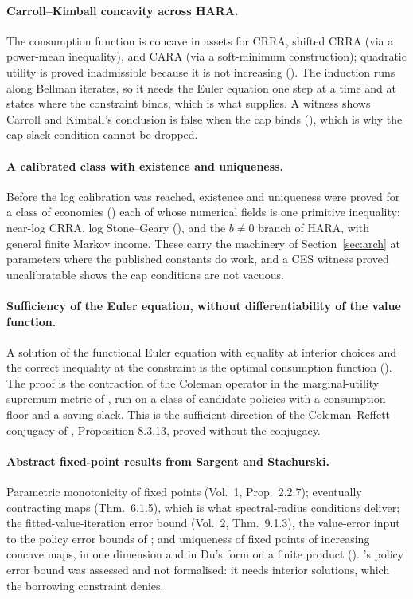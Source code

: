 \paragraph{Carroll--Kimball concavity across HARA.}
The consumption function is concave in assets for CRRA, shifted CRRA (via a power-mean
inequality), and CARA (via a soft-minimum construction); quadratic utility is proved inadmissible
because it is not increasing (). The induction runs along
Bellman iterates, so it needs the Euler equation one step at a time and at states where the
constraint binds, which is what  supplies. A witness shows Carroll and
Kimball's conclusion is false when the cap binds (),
which is why the cap slack condition cannot be dropped.

\paragraph{A calibrated class with existence and uniqueness.}
Before the log calibration was reached, existence and uniqueness were proved for a class of
economies () each of whose numerical fields is one primitive inequality: near-log
CRRA, log Stone--Geary (), and the $b\neq0$
branch of HARA, with general finite Markov income. These carry the machinery of
Section~\ref{sec:arch} at parameters where the published constants do work, and a CES witness
proved uncalibratable shows the cap conditions are not vacuous.

\paragraph{Sufficiency of the Euler equation, without differentiability of the value function.}
A solution of the functional Euler equation with equality at interior choices and the correct
inequality at the constraint is the optimal consumption function
(). The proof is the contraction of the Coleman
operator in the marginal-utility supremum metric of \citet{LiStachurski2014}, run on a class of
candidate policies with a consumption floor and a saving slack. This is the sufficient direction
of the Coleman--Reffett conjugacy of \citet{SargentStachurski2024}, Proposition 8.3.13, proved
without the conjugacy.

\paragraph{Abstract fixed-point results from Sargent and Stachurski.}
Parametric monotonicity of fixed points (Vol.\ 1, Prop.\ 2.2.7); eventually contracting maps
(Thm.\ 6.1.5), which is what spectral-radius conditions deliver; the fitted-value-iteration error
bound (Vol.\ 2, Thm.\ 9.1.3), the value-error input to the policy error bounds of \citet{Li2015};
and uniqueness of fixed points of increasing concave maps, in one dimension and in Du's form on
a finite product (). \citet{Santos2000}'s policy error bound was
assessed and not formalised: it needs interior solutions, which the borrowing constraint denies.

